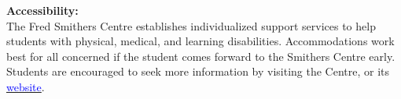 \documentclass[hidelinks]{article}
\begin{document}
	\vspace{0.3cm}
	
	\textbf{Accessibility:}\\
	The Fred Smithers Centre establishes individualized support services to help students with physical, medical, and learning disabilities. Accommodations work best for all concerned if the student comes forward to the Smithers Centre early.  Students are encouraged to seek more information by visiting the Centre, or its \href{http://www.smu.ca/campus-life/fred-smithers-centre.html}{\textcolor{blue}{website}}.	 
\end{document}
